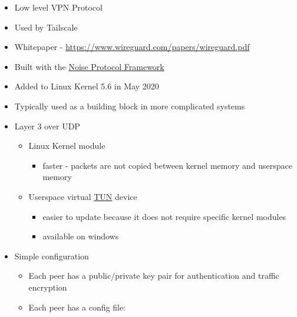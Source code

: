 \begin{itemize}
\tightlist
\item
  Low level VPN Protocol
\item
  Used by Tailscale
\item
  Whitepaper - \url{https://www.wireguard.com/papers/wireguard.pdf}
\item
  Built with the \href{notes/02022-noise.md}{Noise Protocol Framework}
\item
  Added to Linux Kernel 5.6 in May 2020
\item
  Typically used as a building block in more complicated systems
\item
  Layer 3 over UDP

  \begin{itemize}
  \tightlist
  \item
    Linux Kernel module

    \begin{itemize}
    \tightlist
    \item
      faster - packets are not copied between kernel memory and
      userspace memory
    \end{itemize}
  \item
    Userspace virtual \href{notes/02021-internet-protocol}{TUN} device

    \begin{itemize}
    \tightlist
    \item
      easier to update because it does not require specific kernel
      modules
    \item
      available on windows
    \end{itemize}
  \end{itemize}
\item
  Simple configuration

  \begin{itemize}
  \tightlist
  \item
    Each peer has a public/private key pair for authentication and
    traffic encryption
  \item
    Each peer has a config file:
  \end{itemize}
\end{itemize}

\newpage

\begin{Shaded}
\begin{Highlighting}[]
\KeywordTok{[Interface]}
\OtherTok{=}
\OtherTok{=}\StringTok{ }
\OtherTok{=}

\KeywordTok{[Peer]}
\OtherTok{=}
\OtherTok{=}
\OtherTok{=}
\OtherTok{=}\StringTok{ }
\end{Highlighting}
\end{Shaded}

